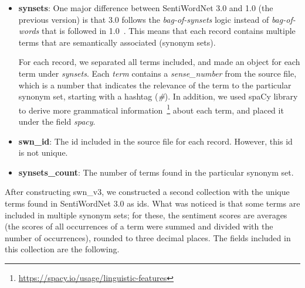 \begin{itemize}
  \item \textbf{synsets}: One major difference between SentiWordNet 3.0
  and 1.0 (the previous version) is
  that 3.0 follows the \emph{bag-of-synsets} logic
  instead of \emph{bag-of-words} that is followed in 1.0~\cite{BES10}.
  This means that each record contains multiple terms
  that are semantically associated (synonym sets).
  
  For each record, we separated all terms included,
  and made an object for each term under \emph{synsets}.
  Each \emph{term} contains a \emph{sense\_number} from the source file,
  which is a number that indicates the relevance of the term
  to the particular synonym set, starting with a hashtag (\emph{\#}).
  In addition, we used spaCy library
  to derive more grammatical information~\footnote{\url{https://spacy.io/usage/linguistic-features}}
  about each term, and placed it under the field \emph{spacy}.
  
  \item \textbf{swn\_id}: The id included in the source file for each record.
  However, this id is not unique.
  
  \item \textbf{synsets\_count}: The number of terms
  found in the particular synonym set.
\end{itemize}

\label{subsubsubsec:english-sentiment-terms}

After constructing swn\_v3,
we constructed a second collection
with the unique terms found in SentiWordNet 3.0 as ids.
What was noticed is that some terms are included
in multiple synonym sets;
for these, the sentiment scores are averages
(the scores of all occurrences of a term were summed
and divided with the number of occurrences),
rounded to three decimal places.
The fields included in this collection are the following.

